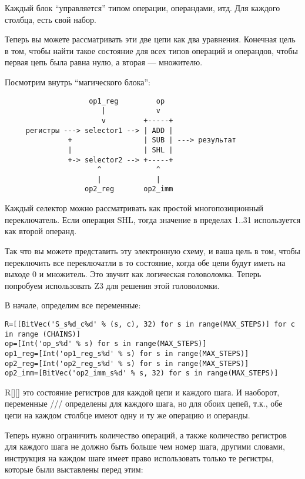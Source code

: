 Каждый блок ``управляется'' типом операции, операндами, итд.
Для каждого столбца, есть свой набор.

Теперь вы можете рассматривать эти две цепи как два уравнения.
Конечная цель в том, чтобы найти такое состояние для всех типов операций и операндов, чтобы первая цепь
была равна нулю, а вторая --- множителю.

Посмотрим внутрь ``магического блока'':

\begin{lstlisting}
	                op1_reg         op
	                   |            v
	                   v         +-----+
	 регистры ---> selector1 --> | ADD |
	           +                 | SUB | ---> результат
	           |                 | SHL |
	           +-> selector2 --> +-----+
	                  ^             ^
	                  |             |
	               op2_reg       op2_imm
\end{lstlisting}

Каждый селектор можно рассматривать как простой многопозиционный переключатель.
Если операция SHL, тогда значение в пределах 1..31 используется как второй операнд.

Так что вы можете представить эту электронную схему, и ваша цель в том, чтобы переключить все переключатли в то состояние,
когда обе цепи будут иметь на выходе 0 и множитель.
Это звучит как логическая головоломка.
Теперь попробуем использовать Z3 для решения этой головоломки.

В начале, определим все переменные:

\begin{lstlisting}
R=[[BitVec('S_s%d_c%d' % (s, c), 32) for s in range(MAX_STEPS)] for c in range (CHAINS)]
op=[Int('op_s%d' % s) for s in range(MAX_STEPS)]
op1_reg=[Int('op1_reg_s%d' % s) for s in range(MAX_STEPS)]
op2_reg=[Int('op2_reg_s%d' % s) for s in range(MAX_STEPS)]
op2_imm=[BitVec('op2_imm_s%d' % s, 32) for s in range(MAX_STEPS)]
\end{lstlisting}

R[][] это состояние регистров для каждой цепи и каждого шага.
И наоборот, переменные /// определены для каждого шага, но для обоих цепей,
т.к., обе цепи на каждом столбце имеют одну и ту же операцию и операнды.

Теперь нужно ограничить количество операций, а также количество регистров для каждого шага не должно быть больше чем
номер шага, другими словами, инструкция на каждом шаге имеет право использовать только те регистры, которые были
выставлены перед этим:

